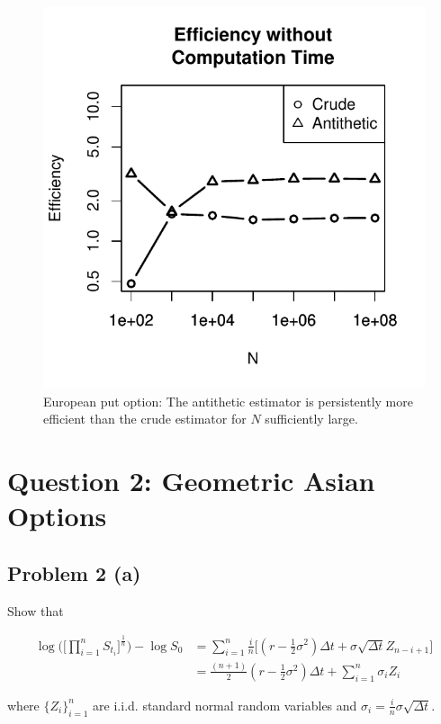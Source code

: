 \documentclass[12pt]{article}
\begin{document}
\begin{figure}[H]
	\centering
 	\includegraphics[scale=0.75]{../plots/q1/call_eff_wo_time.pdf}
\caption{European put option: The antithetic estimator is persistently more efficient than the crude estimator for $N$ sufficiently large.}
\label{fig:call_eff}
\end{figure}

\newpage
\section{Question 2: {\normalfont Geometric Asian Options}}

\subsection{Problem 2 (a)} Show that 

\begin{align*}
	\log \Bigg( \Bigg[ \prod^{n}_{i=1} S_{t_i} \Bigg]^{\frac{1}{n}} \Bigg) - \log S_0 &= \sum^n_{i = 1} \frac{i}{n} \Bigg[ (r - \frac{1}{2}\sigma^2) \Delta t + \sigma \sqrt{\Delta t} Z_{n - i + 1} \Bigg] \\
	&= \frac{(n + 1)}{2} (r - \frac{1}{2}\sigma^2)\Delta t + \sum^n_{i = 1}\sigma_i Z_i
\end{align*}

where $\{Z_i\}^n_{i=1}$ are i.i.d. standard normal random variables and $\sigma_i = \frac{i}{n}\sigma\sqrt{\Delta t}$. \\
\end{document}
